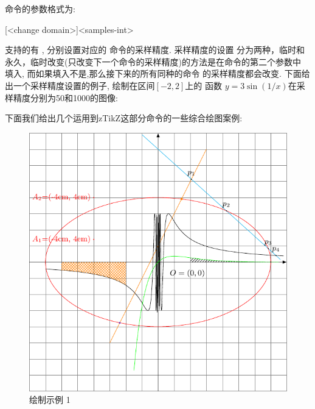 \begin{center}
\end{center}


\cmd{\PlotPrecise}\index{\cmd{\PlotPrecise}}命令的参数格式为:
\begin{codeprint}
[<change domain>]{<samples-int>}
\end{codeprint}

支持的有 , 分别设置对应的
命令\cmd{\Plot, \ParamPlot, \ContourPlot, \PolarPlot}的采样精度. 采样精度的设置
分为两种，临时和永久，临时改变(只改变下一个命令的采样精度)的方法是在命令的第二个参数中
填入\cmd{[once]}, 而如果填入不是,那么接下来的所有同种的命令
的采样精度都会改变. 下面给出一个采样精度设置的例子, 绘制在区间$[-2, 2]$上的
函数 $y=3\sin(1/x)$在采样精度分别为50和1000的图像:

\parbox{.48\linewidth}{
    \centering
}
\parbox{.48\linewidth}{
    \centering
}

下面我们给出几个运用到zTikZ这部分命令的一些综合绘图案例:
\begin{figure}[H]
    \centering
    \includegraphics[width=.65\linewidth]{./pics/ztikz_example_1.pdf}
    \caption{绘制示例 1}
    \label{fig:zTikZ-plot—example-1}
\end{figure}

